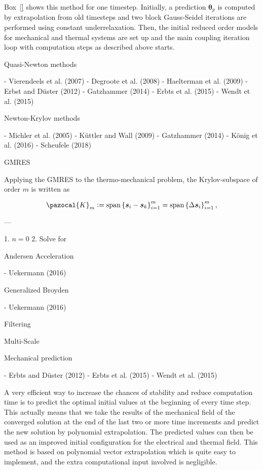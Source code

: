 Box~\ref{} shows this method for one timestep. Initially, a prediction $\boldsymbol \theta_p$ is computed by extrapolation from old timesteps and two block Gauss-Seidel iterations are performed using constant underrelaxation. Then, the initial reduced order models for mechanical and thermal systems are set up and the main coupling iteration loop with computation steps as described above starts.

 Quasi-Newton methods

- Vierendeels et al. (2007)
- Degroote et al. (2008)
- Haelterman et al. (2009)
- Erbst and Düster (2012)
- Gatzhammer (2014)
- Erbts et al. (2015)
- Wendt et al. (2015)

 Newton-Krylov methods

- Michler et al. (2005)
- Küttler and Wall (2009)
- Gatzhammer (2014)
- König et al. (2016)
- Scheufele (2018)

 GMRES

Applying the GMRES to the thermo-mechanical problem, the Krylov-subspace of order $m$ is written as

$$
\pazocal{K}_{m}:=\operatorname{span}\left\{\boldsymbol{s}_{i}-\boldsymbol{s}_{k}\right\}_{i=1}^{m}=\operatorname{span}\left\{\Delta \boldsymbol{s}_{i}\right\}_{i=1}^{m},
$$

---

1. $n = 0$
2. Solve for

 Andersen Acceleration

- Uekermann (2016)

 Generalized Broyden

- Uekermann (2016)

 Filtering

 Multi-Scale

 Mechanical prediction

- Erbts and Düster (2012)
- Erbts et al. (2015)
- Wendt et al. (2015)

A very efficient way to increase the chances of stability and reduce computation time is to predict the optimal initial values at the beginning of every time step. This actually means that we take the results of the mechanical field of the converged solution at the end of the last two or more time increments and predict the new solution by polynomial extrapolation. The predicted values can then be used as an improved initial configuration for the electrical and thermal field. This method is based on polynomial vector extrapolation which is quite easy to implement, and the extra computational input involved is negligible.

